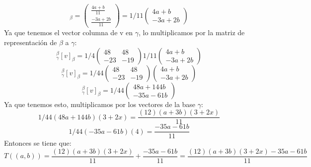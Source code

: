\begin{enumerate}
    \begin{equation*}
        [v]_\beta= \begin{pmatrix}
        \frac{4a+b}{11}\\
        \frac{-3a+2b}{11}
        \end{pmatrix}
        = 1/11\begin{pmatrix}
            4a+b\\
            -3a+2b
        \end{pmatrix}
    \end{equation*}
    Ya que tenemos el vector columna de v en $\gamma$, lo multiplicamos por la matriz de representación de $\beta$ a $\gamma$:
    \begin{equation*}
        [T]_\gamma^\beta [v]_\beta = 1/4 \begin{pmatrix}
            48 & 48\\
            -23 & -19
        \end{pmatrix}
        1/11\begin{pmatrix}
            4a+b\\
            -3a+2b
        \end{pmatrix}
    \end{equation*}
    \begin{equation*}
        [T]_\gamma^\beta [v]_\beta=1/44
        \begin{pmatrix}
            48 & 48\\
            -23 & -19
        \end{pmatrix}
        \begin{pmatrix}
           4a+b\\
            -3a+2b
        \end{pmatrix}
    \end{equation*}
    \begin{equation*}
        [T]_\gamma^\beta [v]_\beta=1/44\begin{pmatrix}
        48a+144b \\
        -35a-61b
        \end{pmatrix}
    \end{equation*}
    Ya que tenemos esto, multiplicamos por los vectores de la base $\gamma$:\\
    \begin{equation*}
        1/44(48a+144b)(3+2x)=\frac{(12)(a+3b)(3+2x)}{11}
    \end{equation*}
    \begin{equation*}
        1/44(-35a-61b)(4)=\frac{-35a-61b}{11} 
    \end{equation*}
    Entonces se tiene que:
    \begin{equation*}
        T((a,b))=\frac{(12)(a+3b)(3+2x)}{11}+\frac{-35a-61b}{11}=\frac{(12)(a+3b)(3+2x)-35a-61b}{11}
    \end{equation*}


\end{enumerate}
